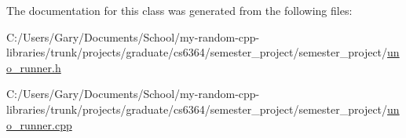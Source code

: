 \-The documentation for this class was generated from the following files\-:\begin{DoxyCompactItemize}
\item 
\-C\-:/\-Users/\-Gary/\-Documents/\-School/my-\/random-\/cpp-\/libraries/trunk/projects/graduate/cs6364/semester\-\_\-project/semester\-\_\-project/\hyperlink{uno__runner_8h}{uno\-\_\-runner.\-h}\item 
\-C\-:/\-Users/\-Gary/\-Documents/\-School/my-\/random-\/cpp-\/libraries/trunk/projects/graduate/cs6364/semester\-\_\-project/semester\-\_\-project/\hyperlink{uno__runner_8cpp}{uno\-\_\-runner.\-cpp}\end{DoxyCompactItemize}
